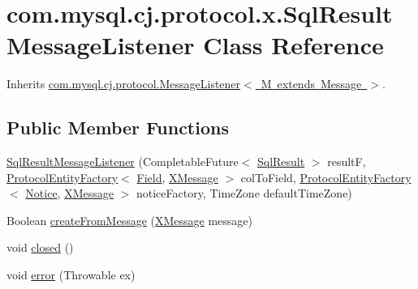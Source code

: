 \hypertarget{classcom_1_1mysql_1_1cj_1_1protocol_1_1x_1_1_sql_result_message_listener}{}\section{com.\+mysql.\+cj.\+protocol.\+x.\+Sql\+Result\+Message\+Listener Class Reference}
\label{classcom_1_1mysql_1_1cj_1_1protocol_1_1x_1_1_sql_result_message_listener}


Inherits \mbox{\hyperlink{interfacecom_1_1mysql_1_1cj_1_1protocol_1_1_message_listener}{com.\+mysql.\+cj.\+protocol.\+Message\+Listener$<$ M extends Message $>$}}.

\subsection*{Public Member Functions}
\begin{DoxyCompactItemize}
\item 
\mbox{\hyperlink{classcom_1_1mysql_1_1cj_1_1protocol_1_1x_1_1_sql_result_message_listener_a7edde22bb73f2b236c3f36064b394ab7}{Sql\+Result\+Message\+Listener}} (Completable\+Future$<$ \mbox{\hyperlink{interfacecom_1_1mysql_1_1cj_1_1xdevapi_1_1_sql_result}{Sql\+Result}} $>$ resultF, \mbox{\hyperlink{interfacecom_1_1mysql_1_1cj_1_1protocol_1_1_protocol_entity_factory}{Protocol\+Entity\+Factory}}$<$ \mbox{\hyperlink{classcom_1_1mysql_1_1cj_1_1result_1_1_field}{Field}}, \mbox{\hyperlink{classcom_1_1mysql_1_1cj_1_1protocol_1_1x_1_1_x_message}{X\+Message}} $>$ col\+To\+Field, \mbox{\hyperlink{interfacecom_1_1mysql_1_1cj_1_1protocol_1_1_protocol_entity_factory}{Protocol\+Entity\+Factory}}$<$ \mbox{\hyperlink{classcom_1_1mysql_1_1cj_1_1protocol_1_1x_1_1_notice}{Notice}}, \mbox{\hyperlink{classcom_1_1mysql_1_1cj_1_1protocol_1_1x_1_1_x_message}{X\+Message}} $>$ notice\+Factory, Time\+Zone default\+Time\+Zone)
\item 
Boolean \mbox{\hyperlink{classcom_1_1mysql_1_1cj_1_1protocol_1_1x_1_1_sql_result_message_listener_a9ae337c27d98176211d9889cc1ae940b}{create\+From\+Message}} (\mbox{\hyperlink{classcom_1_1mysql_1_1cj_1_1protocol_1_1x_1_1_x_message}{X\+Message}} message)
\item 
void \mbox{\hyperlink{classcom_1_1mysql_1_1cj_1_1protocol_1_1x_1_1_sql_result_message_listener_a6d9d429bc58631ea5146aca4e841090f}{closed}} ()
\item 
void \mbox{\hyperlink{classcom_1_1mysql_1_1cj_1_1protocol_1_1x_1_1_sql_result_message_listener_a3ca9df6d049404bea5161c1ac4e3be29}{error}} (Throwable ex)
\end{DoxyCompactItemize}


